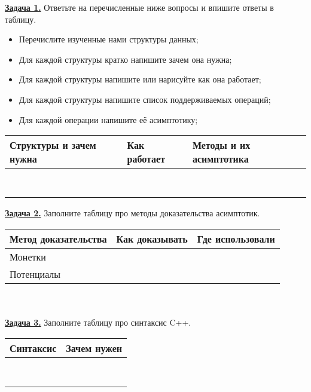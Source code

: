 \def\taskname#1{\underline{\textbf{Задача #1.}}}
\def\taskArow{ & & \\[21 mm] \hline}
\def\taskBrow#1{#1 & & \\[25mm] \hline}
\def\taskCrow{ & \\[15mm] \hline}
\def\tablehead#1{\textbf{#1}}


\taskname{1} Ответьте на перечисленные ниже вопросы и впишите ответы в таблицу.

\begin{itemize}
    \item Перечислите изученные нами структуры данных;
    \item Для каждой структуры кратко напишите зачем она нужна;
    \item Для каждой структуры напишите или нарисуйте как она работает;
    \item Для каждой структуры напишите список поддерживаемых операций;
    \item Для каждой операции напишите её асимптотику;
\end{itemize}

\begin{center}
    \begin{tabular}{|p{58.5mm}|p{67mm}|p{50mm}|}
        \hline
        \tablehead{Структуры и зачем нужна} & \tablehead{Как работает} & \tablehead{Методы и их асимптотика} \\
        \hline
        \taskArow
        \taskArow
        \taskArow
        \taskArow
        \taskArow
        \taskArow
        \taskArow
        \taskArow
    \end{tabular}
\end{center}


\taskname{2} Заполните таблицу про методы доказательства асимптотик.

\begin{center}
    \begin{tabular}{|p{23mm}|p{90mm}|p{62.5mm}|}
        \hline
        \tablehead{Метод доказательства} & \tablehead{Как доказывать} & \tablehead{Где использовали} \\
        \hline
        \taskBrow{Монетки}
        \taskBrow{Потенциалы}
    \end{tabular}
\end{center}


\ \\

\ \\

\taskname{3} Заполните таблицу про синтаксис C++.

\begin{center}
    \begin{tabular}{|p{40mm}|p{140mm}|}
        \hline
        \tablehead{Синтаксис} & \tablehead{Зачем нужен} \\
        \hline
        \taskCrow
        \taskCrow
        \taskCrow
        \taskCrow
        \taskCrow
        \taskCrow
        \taskCrow
        \taskCrow
    \end{tabular}
\end{center}

